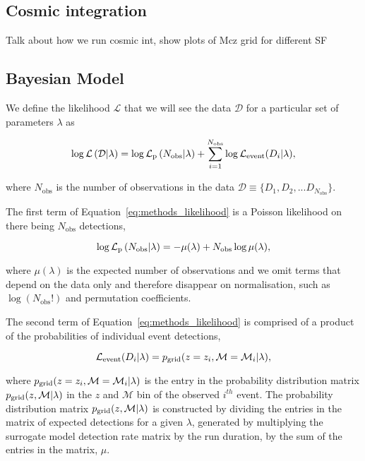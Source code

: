 \documentclass[twocolumn]{aastex631}
\begin{document}
\subsection{Cosmic integration}
Talk about how we run cosmic int,
show plots of Mcz grid for different SF

\subsection{Bayesian Model}
We define the likelihood $\mathcal{L}$ that we will see the data $\mathcal{D}$ for a particular set of parameters $\lambda$ as

\begin{equation}
  \log{\mathcal{L}\left( \mathcal{D} |\lambda\right)} = \log{\Lp\left(N_{\mathrm{obs}}|\lambda\right)} +
  \sum_{i=1}^{N_\mathrm{obs}} \log{\Le(D_i|\lambda)},
  \label{eq:methods_likelihood}
\end{equation}

\bigskip\noindent
where $N_{\mathrm{obs}}$ is the number of observations in the data $\mathcal{D} \equiv \{D_1, D_2, ... D_{N_{\mathrm{obs}}}\}$.

The first term of Equation~\ref{eq:methods_likelihood} is a Poisson likelihood on there being $N_\mathrm{obs}$ detections,

\begin{equation}
  \log{ \Lp\left(N_{\mathrm{obs}}|\lambda\right)} = - \mu(\lambda) + N_{\mathrm{obs}}\log\mu(\lambda) ,
  \label{eq:methods_likelihood_term1}
\end{equation}

\bigskip\noindent
where $\mu(\lambda)$ is the expected number of observations and we omit terms that depend on the data only and therefore disappear on normalisation, such as $\log(N_{\mathrm{obs}}!)$ and permutation coefficients.

The second term of Equation~\ref{eq:methods_likelihood} is comprised of a product of the probabilities of individual event detections,

\begin{equation}
  \Le(D_i|\lambda) = \pg(z=z_i,\mathcal{M}=\mathcal{M}_{i}|\lambda),
  \label{eq:methods_likelihood_term2}
\end{equation}

\bigskip\noindent
where $p_{\rm grid}(z=z_i,\mathcal{M}=\mathcal{M}_{i}|\lambda)$ is the entry in the probability distribution matrix $p_{\rm grid}(z,\mathcal{M}|\lambda)$ in the $z$ and $\mathcal{M}$ bin of the observed $i^{th}$ event.
The probability distribution matrix $p_{\rm grid}(z,\mathcal{M}|\lambda)$ is constructed by dividing the entries in the matrix of expected detections for a given $\lambda$, generated by multiplying the surrogate model detection rate matrix by the run duration, by the sum of the entries in the matrix, $\mu$.
\end{document}
